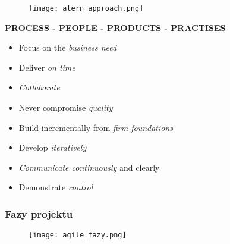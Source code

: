 \documentclass[../main.tex]{subfiles}
\begin{document}
    \begin{figure}[H]
        \texttt{[image: atern\_approach.png]}
    \end{figure}

    \textbf{PROCESS - PEOPLE - PRODUCTS - PRACTISES}
    \begin{itemize}
        \item Focus on the \textit{business need}
        \item Deliver \textit{on time}
        \item \textit{Collaborate}
        \item Never compromise \textit{quality}
        \item Build incrementally from \textit{firm foundations}
        \item Develop \textit{iteratively}
        \item \textit{Communicate continuously} and clearly
        \item Demonstrate \textit{control}
    \end{itemize}



    \subsubsection{Fazy projektu}
    \begin{figure}[H]
        \texttt{[image: agile\_fazy.png]}
    \end{figure}
\end{document}
